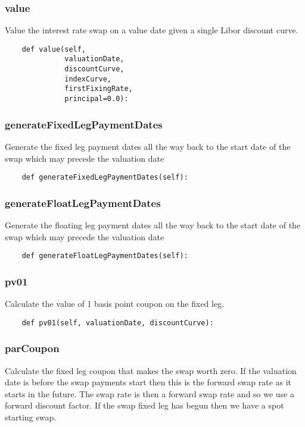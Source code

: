 \documentclass[twoside,11pt]{book}
\begin{document}
\subsubsection*{{\bf value}}
Value the interest rate swap on a value date given a single Libor discount curve.  

\begin{lstlisting}
    def value(self,
              valuationDate,
              discountCurve,
              indexCurve,
              firstFixingRate,
              principal=0.0):
\end{lstlisting}

\subsubsection*{{\bf generateFixedLegPaymentDates}}
Generate the fixed leg payment dates all the way back to the start date of the swap which may precede the valuation date 

\begin{lstlisting}
    def generateFixedLegPaymentDates(self):
\end{lstlisting}

\subsubsection*{{\bf generateFloatLegPaymentDates}}
Generate the floating leg payment dates all the way back to the start date of the swap which may precede the valuation date 

\begin{lstlisting}
    def generateFloatLegPaymentDates(self):
\end{lstlisting}

\subsubsection*{{\bf pv01}}
Calculate the value of 1 basis point coupon on the fixed leg.  

\begin{lstlisting}
    def pv01(self, valuationDate, discountCurve):
\end{lstlisting}

\subsubsection*{{\bf parCoupon}}
Calculate the fixed leg coupon that makes the swap worth zero.  If the valuation date is before the swap payments start then this  is the forward swap rate as it starts in the future. The swap rate  is then a forward swap rate and so we use a forward discount  factor. If the swap fixed leg has begun then we have a spot  starting swap.  
\end{document}
